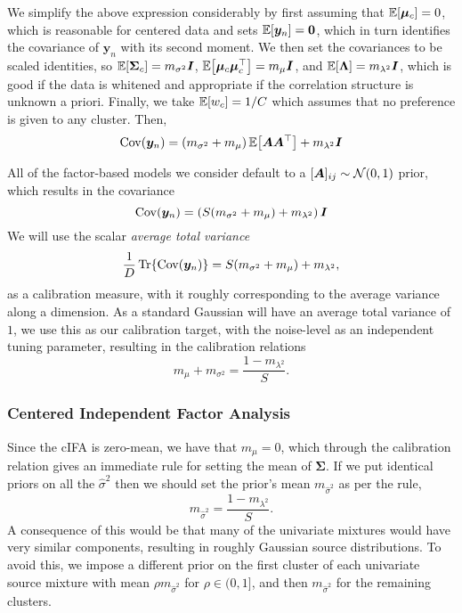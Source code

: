 \documentclass{article}
\newcommand{\mix}{\bm{A}}
\newcommand{\mixvec}{\bm{a}}
\newcommand{\obs}{y}
\newcommand{\obsvec}{\bm{\obs}}
\newcommand{\noisecov}{\bm{\Lambda}}
\newcommand{\noisescalesq}{\lambda^2}
\newcommand{\mean}{\mu}
\newcommand{\meanvec}{\bm{\mean}}
\newcommand{\scale}{\sigma}
\newcommand{\scalesq}{\scale^2}
\newcommand{\weight}{w}
\newcommand{\subscale}{\hat{\sigma}}
\newcommand{\subscalesq}{\subscale^2}
\newcommand{\compweight}{{\weight}}
\newcommand{\compmean}{{\mean}}
\newcommand{\compmeanvec}{{\meanvec}}
\newcommand{\compcov}{{\bm{\Sigma}}}
\newcommand{\numfactor}{S}
\newcommand{\numcluster}{C}
\newcommand{\icluster}{c}
\newcommand{\ifactor}{s}
\newcommand{\obsdim}{D}
\begin{document}
We simplify the above expression considerably by first assuming that $\E{\compmeanvec_\icluster}=0$, which is reasonable for centered data and sets $\E{\obsvec_n}=\bm{0}$, which in turn identifies the covariance of $\obsvec_n$ with its second moment. We then set the covariances to be scaled identities, so $\E{\compcov_{\icluster}}=m_{\scalesq}\bm{I}$, $\E{\compmeanvec_\icluster\compmeanvec_\icluster\T}=m_{\compmean}\bm{I}$, and $\E{\noisecov}=m_{\noisescalesq}\bm{I}$, which is good if the data is whitened and appropriate if the correlation structure is unknown a priori. Finally, we take $\E{\compweight_\icluster}=1/\numcluster$ which assumes that no preference is given to any cluster. Then, %
\begin{equation}
\Cov{\obsvec_n}=(m_{\scalesq}+m_{\compmean})\E{\mix\mix\T}+m_{\noisescalesq}\bm{I}
\end{equation}


All of the factor-based models we consider default to a $[\mix]_{ij}\sim\gaussrnd(0,1)$ prior, which results in the covariance
\begin{equation}
\Cov{\obsvec_n}=\left(\numfactor(m_{\scalesq}+m_{\compmean})+m_{\noisescalesq}\right)\bm{I}
\end{equation}
We will use the scalar \emph{average total variance} 
\begin{equation}
\frac{1}{\obsdim}\Tr{\Cov{\obsvec_n}}=\numfactor(m_{\scalesq}+m_{\compmean})+m_{\noisescalesq},
\end{equation}
as a calibration measure, with it roughly corresponding to the average variance along a dimension. As a standard Gaussian will have an average total variance of $1$, we use this as our calibration target, with the noise-level as an independent tuning parameter, resulting in the calibration relations
\begin{equation}
\label{eq:calibration}
m_{\compmean}+m_{\scalesq}=\frac{1-m_{\noisescalesq}}{\numfactor}.
\end{equation}
\subsubsection{Centered Independent Factor Analysis}
Since the cIFA is zero-mean, we have that $m_{\compmean}=0$, which through the calibration relation gives an immediate rule for setting the mean of $\compcov$. If we put identical priors on all the $\subscalesq$ then we should set the prior's mean $m_{\subscalesq}$ as per the rule,
\begin{equation}
m_{\subscalesq}=\frac{1-m_{\noisescalesq}}{\numfactor}.
\end{equation}
 A consequence of this would be that many of the univariate mixtures would have very similar components, resulting in roughly Gaussian source distributions. To avoid this, we impose a different prior on the first cluster of each univariate source mixture with mean $\rho {m}_{\subscalesq}$ for $\rho\in (0,1]$, and then ${m}_{\subscalesq}$ for the remaining clusters.
\end{document}
